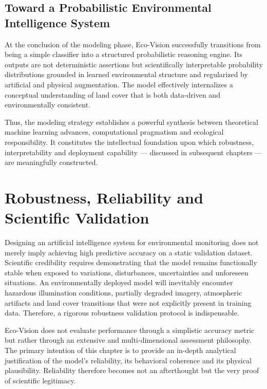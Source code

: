 \documentclass[12pt,a4paper]{report}
\begin{document}
\section{Toward a Probabilistic Environmental Intelligence System}

At the conclusion of the modeling phase, Eco-Vision successfully transitions from being a simple classifier into a structured probabilistic reasoning engine. Its outputs are not deterministic assertions but scientifically interpretable probability distributions grounded in learned environmental structure and regularized by artificial and physical augmentation. The model effectively internalizes a conceptual understanding of land cover that is both data-driven and environmentally consistent.

Thus, the modeling strategy establishes a powerful synthesis between theoretical machine learning advances, computational pragmatism and ecological responsibility. It constitutes the intellectual foundation upon which robustness, interpretability and deployment capability — discussed in subsequent chapters — are meaningfully constructed.

\newpage


\chapter{Robustness, Reliability and Scientific Validation}

Designing an artificial intelligence system for environmental monitoring does not merely imply achieving high predictive accuracy on a static validation dataset. Scientific credibility requires demonstrating that the model remains functionally stable when exposed to variations, disturbances, uncertainties and unforeseen situations. An environmentally deployed model will inevitably encounter hazardous illumination conditions, partially degraded imagery, atmospheric artifacts and land cover transitions that were not explicitly present in training data. Therefore, a rigorous robustness validation protocol is indispensable.

Eco-Vision does not evaluate performance through a simplistic accuracy metric but rather through an extensive and multi-dimensional assessment philosophy. The primary intention of this chapter is to provide an in-depth analytical justification of the model's reliability, its behavioral coherence and its physical plausibility. Reliability therefore becomes not an afterthought but the very proof of scientific legitimacy.
\end{document}
